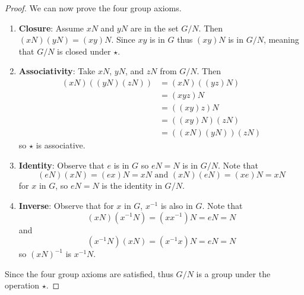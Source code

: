 \begin{proof}
    We can now prove the four group axioms.
    \begin{enumerate}
        \item \textbf{Closure}: Assume $xN$ and $yN$ are in the set $G/N$. Then $(xN)(yN) = (xy)N$. Since $xy$ is in $G$ thus $(xy)N$ is in $G/N$, meaning that $G/N$ is closed under $\star$.
        \item \textbf{Associativity}: Take $xN$, $yN$, and $zN$ from $G/N$. Then
        \begin{align*}
            (xN)\left((yN)(zN)\right) &= (xN)\left((yz)N\right)\\
            &= (xyz)N\\
            &= \left((xy)z\right)N\\
            &= \left((xy)N\right)(zN)\\
            &= \left((xN)(yN)\right)(zN)
        \end{align*}
        so $\star$ is associative.
        \item \textbf{Identity}: Observe that $e$ is in $G$ so $eN = N$ is in $G / N$. Note that
        \[
        (eN)(xN) = (ex)N = xN \text{ and } (xN)(eN) = (xe)N = xN
        \]
        for $x$ in $G$, so $eN = N$ is the identity in $G/N$.
        \item \textbf{Inverse}: Observe that for $x$ in $G$, $x^{-1}$ is also in $G$. Note that
        \[
        (xN)(x^{-1}N) = (xx^{-1})N = eN = N
        \]
        and
        \[
        (x^{-1}N)(xN) = (x^{-1}x)N = eN = N
        \]
        so $(xN)^{-1}$ is $x^{-1}N$.
    \end{enumerate}
    Since the four group axioms are satisfied, thus $G/N$ is a group under the operation $\star$.
\end{proof}

